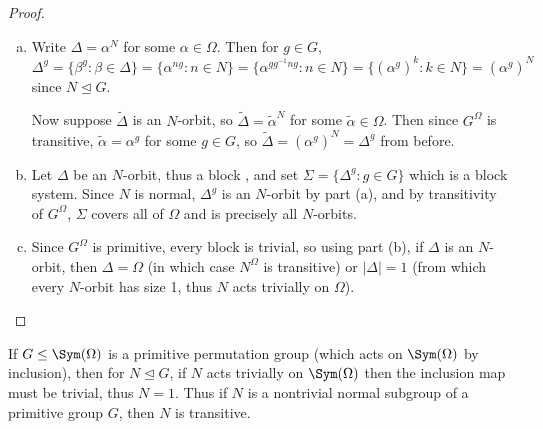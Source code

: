 \begin{proof}
    \begin{enumerate}[(a)]
        \item Write $\Delta = \alpha^N$ for some $\alpha \in \Omega$. Then for $g \in G$, $\Delta^g = \{\beta^g : \beta \in \Delta\} = \{\alpha^{ng} : n \in N\} = \{\alpha^{gg^{-1}ng} : n \in N\} = \{(\alpha^g)^k : k \in N\} = (\alpha^g)^N$ since $N \unlhd G$.

              Now suppose $\tilde\Delta$ is an $N$-orbit, so $\tilde\Delta = \tilde\alpha^N$ for some $\tilde\alpha \in \Omega$. Then since $G^\Omega$ is transitive, $\tilde\alpha = \alpha^g$ for some $g \in G$, so $\tilde\Delta = (\alpha^g)^N = \Delta^g$ from before.
        \item Let $\Delta$ be an $N$-orbit, thus a block , and set $\Sigma = \{\Delta^g : g \in G\}$ which is a block system. Since $N$ is normal, $\Delta^g$ is an $N$-orbit by part (a), and by transitivity of $G^\Omega$, $\Sigma$ covers all of $\Omega$ and is precisely all $N$-orbits.
        \item Since $G^\Omega$ is primitive, every block is trivial, so using part (b), if $\Delta$ is an $N$-orbit, then $\Delta = \Omega$ (in which case $N^\Omega$ is transitive) or $|\Delta| = 1$ (from which every $N$-orbit has size 1, thus $N$ acts trivially on $\Omega$).
    \end{enumerate}
\end{proof}

If $G \leq \Sym(\Omega)$ is a primitive permutation group (which acts on $\Sym(\Omega)$ by inclusion), then for $N \unlhd G$, if $N$ acts trivially on $\Sym(\Omega)$ then the inclusion map must be trivial, thus $N = 1$. Thus if $N$ is a nontrivial normal subgroup of a primitive group $G$, then $N$ is transitive.